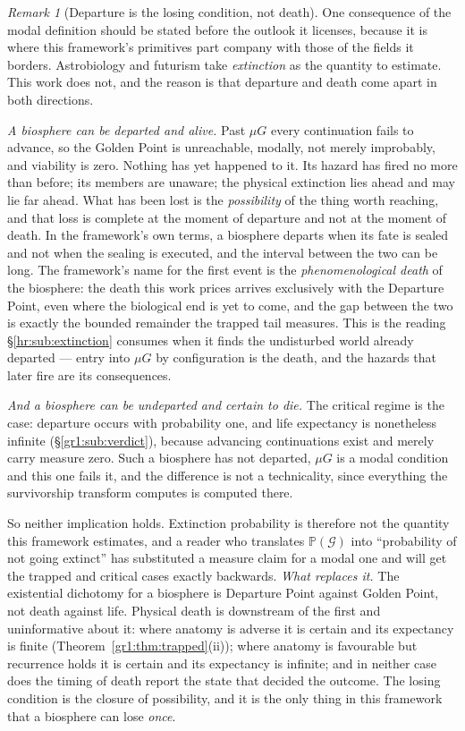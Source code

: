 \documentclass[11pt]{article}
\numberwithin{equation}{section}
\theoremstyle{plain}
\theoremstyle{definition}
\theoremstyle{remark}
\newtheorem{remark}[theorem]{Remark}
\newcommand{\PP}{\mathbb{P}}
\begin{document}
\begin{remark}[Departure is the losing condition, not death]
\label{ac:rem:losingcondition}
One consequence of the modal definition should be stated before the
outlook it licenses, because it is where this framework's primitives
part company with those of the fields it borders. Astrobiology and
futurism take \emph{extinction} as the quantity to estimate. This work
does not, and the reason is that departure and death come apart in both
directions.

\emph{A biosphere can be departed and alive.} Past $\mu G$ every
continuation fails to advance, so the Golden Point is unreachable, modally, not merely improbably, and viability is zero. Nothing has yet
happened to it. Its hazard has fired no more than before; its members
are unaware; the physical extinction lies ahead and may lie far ahead.
What has been lost is the \emph{possibility} of the thing worth
reaching, and that loss is complete at the moment of departure and not
at the moment of death. In the framework's own terms, a biosphere
departs when its fate is sealed and not when the sealing is executed,
and the interval between the two can be long. The framework's name for the
first event is the \emph{phenomenological death} of the biosphere: the
death this work prices arrives exclusively with the Departure Point,
even where the biological end is yet to come, and the gap between the
two is exactly the bounded remainder the trapped tail measures. This is
the reading \S\ref{hr:sub:extinction} consumes when it finds the
undisturbed world already departed --- entry into $\mu G$ by
configuration is the death, and the hazards that later fire are its
consequences.

\emph{And a biosphere can be undeparted and certain to die.} The
critical regime is the case: departure occurs with probability one, and
life expectancy is nonetheless infinite (\S\ref{gr1:sub:verdict}),
because advancing continuations exist and merely carry measure zero.
Such a biosphere has not departed, $\mu G$ is a modal condition and
this one fails it, and the difference is not a technicality, since
everything the survivorship transform computes is computed there.

So neither implication holds. Extinction probability is therefore not
the quantity this framework estimates, and a reader who translates
$\PP(\mathcal G)$ into ``probability of not going extinct'' has
substituted a measure claim for a modal one and will get the trapped and
critical cases exactly backwards. \emph{What replaces it.} The existential dichotomy for a biosphere is
Departure Point against Golden Point, not death against life. Physical
death is downstream of the first and uninformative about it: where
anatomy is adverse it is certain and its expectancy is finite
(Theorem~\ref{gr1:thm:trapped}(ii)); where anatomy is favourable but
recurrence holds it is certain and its expectancy is infinite; and in
neither case does the timing of death report the state that decided the
outcome. The losing condition is the closure of possibility, and it is
the only thing in this framework that a biosphere can lose \emph{once}.
\end{remark}
\end{document}
